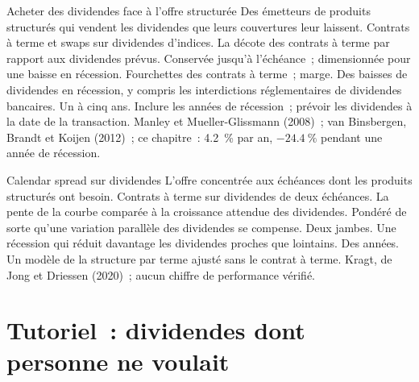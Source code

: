 \begin{strategyfile}{Acheter des dividendes face à l'offre structurée}\label{strat:s2:delta-one-and-dividends:dividends}
 Des émetteurs de produits structurés qui vendent les dividendes que leurs couvertures leur laissent.
 Contrats à terme et swaps sur dividendes d'indices.
 La décote des contrats à terme par rapport aux dividendes prévus.
 Conservée jusqu'à l'échéance~; dimensionnée pour une baisse en récession.
 Fourchettes des contrats à terme~; marge.
 Des baisses de dividendes en récession, y compris les interdictions réglementaires de dividendes bancaires.
 Un à cinq ans.
 Inclure les années de récession~; prévoir les dividendes à la date de la transaction.
 Manley et Mueller-Glissmann (2008)~; van Binsbergen, Brandt et Koijen (2012)~; ce chapitre~: 4.2~\% par an, $-24.4~\%$ pendant une
année de récession.
\end{strategyfile}

\begin{strategyfile}{Calendar spread sur dividendes}\label{strat:s2:delta-one-and-dividends:calendar}
 L'offre concentrée aux échéances dont les produits structurés ont besoin.
 Contrats à terme sur dividendes de deux échéances.
 La pente de la courbe comparée à la croissance attendue des dividendes.
 Pondéré de sorte qu'une variation parallèle des dividendes se compense.
 Deux jambes.
 Une récession qui réduit davantage les dividendes proches que lointains.
 Des années.
 Un modèle de la structure par terme ajusté sans le contrat à terme.
 Kragt, de Jong et Driessen (2020)~; aucun chiffre de performance vérifié.
\end{strategyfile}

\section{Tutoriel~: dividendes dont personne ne voulait}\label{tut:s2:delta-one-and-dividends:tut}

